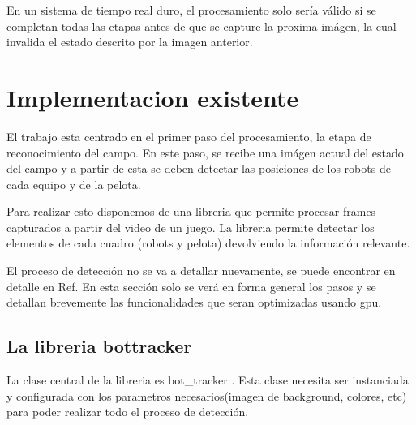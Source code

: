 \documentclass[a4paper,10pt]{report}
\begin{document}
En un sistema de tiempo real duro, el procesamiento solo sería válido si se completan todas las etapas antes de que se capture la proxima imágen, la cual invalida el estado descrito por la imagen anterior.

\section{Implementacion existente}

El trabajo esta centrado en el primer paso del procesamiento, la etapa de reconocimiento del campo. 
En este paso, se recibe una imágen actual del estado del campo y a partir de esta se deben detectar las posiciones de los robots de cada equipo y de la pelota.

Para realizar esto disponemos de una libreria que permite procesar frames capturados a partir del video de un juego. 
La libreria permite detectar los elementos de cada cuadro (robots y pelota) devolviendo la información relevante. 

El proceso de detección no se va a detallar nuevamente, se puede encontrar en detalle en Ref. \cite[capitulo 5]{Jaureguiberry}
En esta sección solo se verá en forma general los pasos y se detallan brevemente las funcionalidades que seran optimizadas usando gpu.


\subsection{La libreria bottracker}

La clase central de la libreria es bot\_tracker \cite[]{Jaureguiberry}. Esta clase necesita ser instanciada y configurada con los parametros necesarios(imagen de background, colores, etc) para poder realizar todo el proceso de detección.
\end{document}
